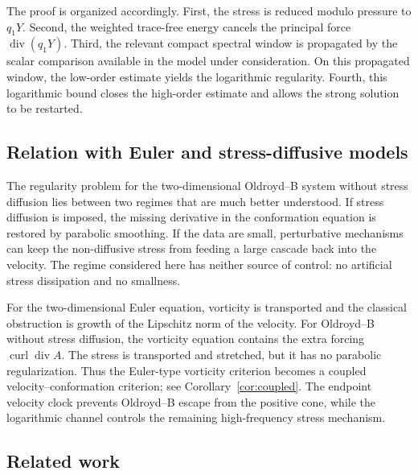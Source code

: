 \documentclass[11pt]{article}
\newcommand{\divv}{\operatorname{div}}
\newcommand{\curl}{\operatorname{curl}}
\begin{document}
The proof is organized accordingly.  First, the stress is reduced modulo
pressure to \(q_1Y\).  Second, the weighted trace-free energy cancels the
principal force \(\divv(q_1Y)\).  Third, the relevant compact spectral window is
propagated by the scalar comparison available in the model under consideration.
On this propagated window, the low-order estimate yields the logarithmic
regularity.  Fourth, this logarithmic bound closes the high-order estimate and
allows the strong solution to be restarted.

\subsection{Relation with Euler and stress-diffusive models}

The regularity problem for the two-dimensional Oldroyd--B system
without stress diffusion lies between two regimes that are much better
understood.  If stress diffusion is imposed, the missing derivative in the
conformation equation is restored by parabolic smoothing.  If the data are
small, perturbative mechanisms can keep the non-diffusive stress from feeding a
large cascade back into the velocity.  The regime considered here has neither source of control: no artificial
stress dissipation and no smallness.

For the two-dimensional Euler equation, vorticity is transported and the
classical obstruction is growth of the Lipschitz norm of the velocity.  For
Oldroyd--B without stress diffusion, the vorticity equation contains the extra
forcing \(\curl\divv A\).  The stress is transported and stretched, but it has
no parabolic regularization.  Thus the Euler-type vorticity criterion becomes
a coupled velocity--conformation criterion; see Corollary~\ref{cor:coupled}.
The endpoint velocity clock prevents Oldroyd--B escape from the positive cone,
while the logarithmic channel controls the remaining high-frequency
stress mechanism.

\subsection{Related work}
\end{document}
